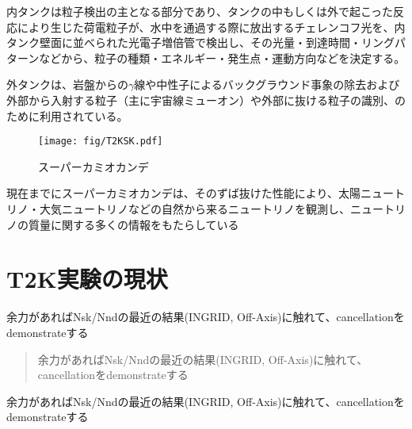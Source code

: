 内タンクは粒子検出の主となる部分であり、タンクの中もしくは外で起こった反応により生じた荷電粒子が、水中を通過する際に放出するチェレンコフ光を、内タンク壁面に並べられた光電子増倍管で検出し、その光量・到達時間・リングパターンなどから、粒子の種類・エネルギー・発生点・運動方向などを決定する。

外タンクは、岩盤からの$\gamma$線や中性子によるバックグラウンド事象の除去および外部から入射する粒子（主に宇宙線ミューオン）や外部に抜ける粒子の識別、のために利用されている。

\begin{figure}[!htb]
\centering
\texttt{[image: fig/T2KSK.pdf]}
\caption[スーパーカミオカンデ]{スーパーカミオカンデ}
\label{SuperKamiokande}
\end{figure}

現在までにスーパーカミオカンデは、そのずば抜けた性能により、太陽ニュートリノ・大気ニュートリノなどの自然から来るニュートリノを観測し、ニュートリノの質量に関する多くの情報をもたらしている

\section{T2K実験の現状}
余力があればNsk/Nndの最近の結果(INGRID, Off-Axis)に触れて、cancellationをdemonstrateする

\begin{quote}
余力があればNsk/Nndの最近の結果(INGRID, Off-Axis)に触れて、cancellationをdemonstrateする
\end{quote}

余力があればNsk/Nndの最近の結果(INGRID, Off-Axis)に触れて、cancellationをdemonstrateする
\fi